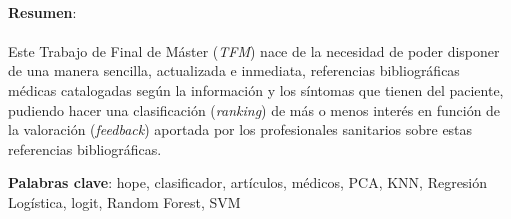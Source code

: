 \paragraph{}
\textbf{Resumen}:
\paragraph{}
Este Trabajo de Final de Máster (\textit{TFM}) nace de la necesidad de poder disponer de una manera sencilla, actualizada e inmediata, referencias bibliográficas médicas catalogadas según la información y los síntomas que tienen del paciente, pudiendo hacer una clasificación (\textit{ranking}) de más o menos interés en función de la valoración (\textit{feedback}) aportada por los profesionales sanitarios sobre estas referencias bibliográficas.

\vspace{1.5cm}

\textbf{Palabras clave}: hope, clasificador, artículos, médicos, PCA, KNN, Regresión Logística, logit, Random Forest, SVM